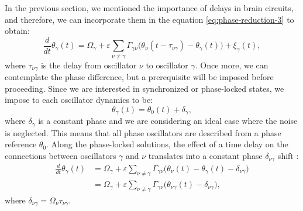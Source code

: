 \documentclass[../main.tex]{subfiles}
\begin{document}
In the previous section, we mentioned the importance of delays in brain circuits, and therefore, we can incorporate them in the  equation \eqref{eq:phase-reduction-3} to obtain:
\begin{equation}
\displaystyle\frac{d}{dt}\theta_\gamma(t) = \Omega_\gamma + \varepsilon\displaystyle\sum_{\nu\neq\gamma}\Gamma_{\gamma\nu}\big(\theta_\nu(t-\tau_{\nu\gamma})-\theta_\gamma(t)\big) + \xi_\gamma(t),
     \label{eq:phase-reduction-5}
\end{equation}
where $\tau_{\nu\gamma}$ is the delay from oscillator $\nu$ to oscillator $\gamma$. 
Once more, we can contemplate the phase difference, but a prerequisite will be imposed before proceeding.
Since we are interested in synchronized or phase-locked states, we impose to each oscillator dynamics to be:
\clearpage
\begin{equation}
    \theta_{\gamma}(t) = \theta_0(t) + \delta_\gamma,
\end{equation}
where $\delta_\gamma$ is a constant phase and we are considering an ideal case where the noise is neglected.
This means that all phase oscillators are described from a phase reference $\theta_0$.
Along the phase-locked solutions, the effect of a time delay on the connections between oscillators $\gamma$ and $\nu$  translates into a constant phase $\delta_{\nu\gamma}$ shift \citep{mirasso_anticipated_2017}:
\begin{equation}
\begin{aligned}
    \displaystyle\frac{d}{dt}\theta_\gamma(t)  &= \Omega_\gamma + \varepsilon\displaystyle\sum_{\nu\ne\gamma}\Gamma_{\gamma\nu}\big( \theta_\nu(t)-\theta_\gamma(t)-\delta_{\nu\gamma}\big)\\
    \quad &= \Omega_\gamma +\varepsilon\displaystyle\sum_{\nu\ne\gamma}\Gamma_{\gamma\nu}\big( \theta_{\nu\gamma}(t)-\delta_{\nu\gamma}\big),
\end{aligned}
    \label{eq:phase-reduction-6}
\end{equation} 
where $\delta_{\nu\gamma} = \Omega_\nu\tau_{\nu\gamma}$.
\end{document}
